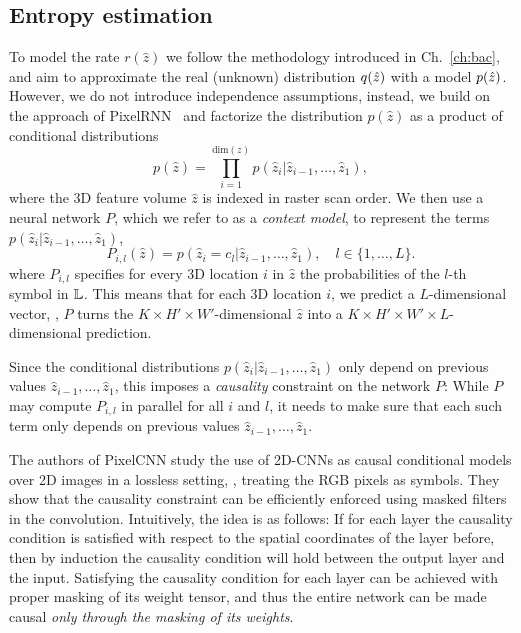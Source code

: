\subsection{Entropy estimation}
\label{imgc:sec:entropyest}


To model the rate $r(\hat z)$ we follow the methodology introduced in Ch.~\ref{ch:bac}, and aim to approximate the real (unknown) distribution $q(\hat z)$ with 
a model $p(\hat z)$. However, we do not introduce independence assumptions, instead, we
build on the approach of PixelRNN~\cite{van2016pixel} and factorize the distribution $p(\hat z)$ as a product of conditional distributions
\begin{equation}
    p(\hat z) = \prod_{i=1}^{\text{dim}(z)} p(\hat{z}_i|\hat{z}_{i-1},\ldots,\hat{z}_1), \label{imgc:eq:condprob}
\end{equation}
where the 3D feature volume $\hat z$ is indexed in raster scan order. 
We then use a neural network $P$, which we refer to as a \textit{context model}, to represent the terms $p(\hat{z}_i|\hat{z}_{i-1},\ldots,\hat{z}_1)$,
\begin{equation}
    P_{i,l}(\hat z) = p(\hat{z}_i=c_l|\hat{z}_{i-1},\ldots,\hat{z}_1), \quad l \in \{1,\ldots,L\}.
\end{equation}
where $P_{i,l}$ specifies for every 3D location $i$ in $\hat z$ the probabilities of the $l$-th symbol in $\mathbb{L}$. 
This means that for each 3D location $i$, we predict a $L$-dimensional vector, \ie, $P$ turns the $K{\times}H'{\times}W'$-dimensional $\hat z$ into a $K{\times}H'{\times}W'{\times}L$-dimensional prediction.

Since the conditional distributions $p(\hat{z}_i|\hat{z}_{i-1},\ldots,\hat{z}_1)$ only depend on previous values $\hat{z}_{i-1},\ldots,\hat{z}_1$, this imposes a \textit{causality} constraint on the network $P$: While $P$ may compute $P_{i,l}$ in parallel for all $i$ and $l$, it needs to make sure that each such term only depends on previous values $\hat{z}_{i-1},\ldots,\hat{z}_1$.

The authors of PixelCNN \cite{van2016pixel,van2016conditional} study the use of
2D-CNNs as causal conditional models over 2D images in a lossless setting, \ie,
treating the RGB pixels as symbols. They show that the causality constraint can
be efficiently enforced using masked filters in the convolution. Intuitively,
the idea is as follows: If for each layer the causality condition is satisfied
with respect to the spatial coordinates of the layer before, then by induction
the causality condition will hold between the output layer and the input.
Satisfying the causality condition for each layer can be achieved with proper
masking of its weight tensor, and thus the entire network can be made causal
\textit{only through the masking of its weights}. 

